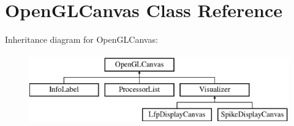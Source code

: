 \hypertarget{classOpenGLCanvas}{\section{Open\-G\-L\-Canvas Class Reference}
\label{classOpenGLCanvas}
}
Inheritance diagram for Open\-G\-L\-Canvas\-:\begin{figure}[H]
\begin{center}
\leavevmode
\includegraphics[height=3.000000cm]{classOpenGLCanvas}
\end{center}
\end{figure}
